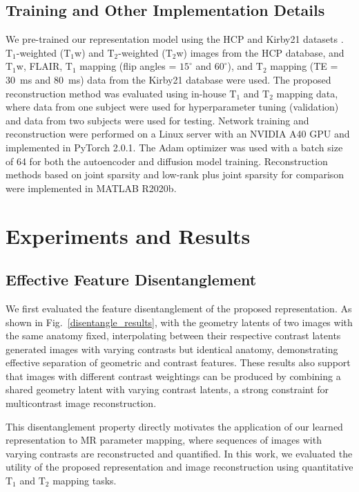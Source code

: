\documentclass[journal,twoside,web]{ieeecolor}
\begin{document}
\subsection{Training and Other Implementation Details} \label{training}
We pre-trained our representation model using the HCP and Kirby21 datasets \cite{van2013wu,landman2011multi}. $\text{T}_1$-weighted ($\text{T}_1$w) and $\text{T}_2$-weighted ($\text{T}_2$w) images from the HCP database, and $\text{T}_1$w, FLAIR, $\text{T}_1$ mapping (flip angles = $15^{\circ}$ and $60^{\circ}$), and $\text{T}_2$ mapping (TE = 30~ms and 80~ms) data from the Kirby21 database were used. The proposed reconstruction method was evaluated using in-house $\text{T}_1$ and $\text{T}_2$ mapping data, where data from one subject were used for hyperparameter tuning (validation) and data from two subjects were used for testing. Network training and reconstruction were performed on a Linux server with an NVIDIA A40 GPU and implemented in PyTorch 2.0.1. The Adam optimizer was used with a batch size of 64 for both the autoencoder and diffusion model training. Reconstruction methods based on joint sparsity and low-rank plus joint sparsity for comparison were implemented in MATLAB R2020b.

\section{Experiments and Results} \label{Results}
\subsection{Effective Feature Disentanglement}
We first evaluated the feature disentanglement of the proposed representation. As shown in Fig.~\ref{disentangle_results}, with the geometry latents of two images with the same anatomy fixed, interpolating between their respective contrast latents generated images with varying contrasts but identical anatomy, demonstrating effective separation of geometric and contrast features. These results also support that images with different contrast weightings can be produced by combining a shared geometry latent with varying contrast latents, a strong constraint for multicontrast image reconstruction. 

This disentanglement property directly motivates the application of our learned representation to MR parameter mapping, where sequences of images with varying contrasts are reconstructed and quantified. In this work, we evaluated the utility of the proposed representation and image reconstruction using quantitative $\text{T}_1$ and 
$\text{T}_2$ mapping tasks. 
\end{document}
